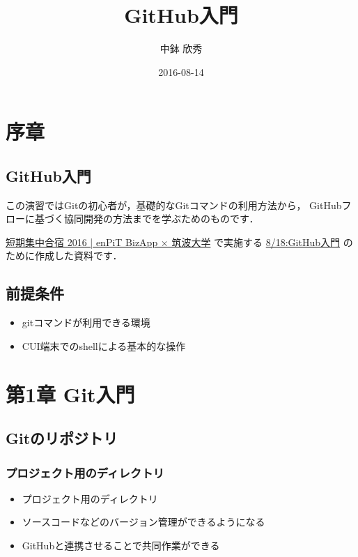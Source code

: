 \documentclass{bxjsarticle}
\author{中鉢 欣秀}
\date{2016-08-14}
\title{GitHub入門}
\begin{document}
\maketitle
\tableofcontents


\section{序章}
\label{sec-1}
\subsection{GitHub入門}
\label{sec-1-1}
この演習ではGitの初心者が，基礎的なGitコマンドの利用方法から，
GitHubフローに基づく協同開発の方法までを学ぶためのものです．

\href{http://www.cs.tsukuba.ac.jp/enPiT/summercamp2016/}{短期集中合宿 2016 | enPiT BizApp × 筑波大学} で実施する
\href{http://www.cs.tsukuba.ac.jp/enPiT/summercamp2016/#818}{8/18:GitHub入門} のために作成した資料です．

\subsection{前提条件}
\label{sec-1-2}
\begin{itemize}
\item gitコマンドが利用できる環境
\item CUI端末でのshellによる基本的な操作
\end{itemize}

\section{第1章 Git入門}
\label{sec-2}
\subsection{Gitのリポジトリ}
\label{sec-2-1}
\subsubsection{プロジェクト用のディレクトリ}
\label{sec-2-1-1}
\begin{itemize}
\item プロジェクト用のディレクトリ
\item ソースコードなどのバージョン管理ができるようになる
\item GitHubと連携させることで共同作業ができる
\end{itemize}
\end{document}
